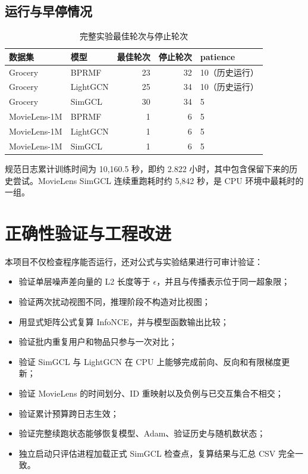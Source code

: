 \documentclass[UTF8,a4paper,12pt]{ctexart}
\begin{document}
\subsection{运行与早停情况}

\begin{table}[H]
  \centering
  \caption{完整实验最佳轮次与停止轮次}
  \label{tab:epochs}
  \begin{tabular}{llrrl}
    \toprule
    数据集 & 模型 & 最佳轮次 & 停止轮次 & patience\\
    \midrule
    Grocery & BPRMF & 23 & 32 & 10（历史运行）\\
    Grocery & LightGCN & 25 & 34 & 10（历史运行）\\
    Grocery & SimGCL & 30 & 34 & 5\\
    MovieLens-1M & BPRMF & 1 & 6 & 5\\
    MovieLens-1M & LightGCN & 1 & 6 & 5\\
    MovieLens-1M & SimGCL & 1 & 6 & 5\\
    \bottomrule
  \end{tabular}
\end{table}

规范日志累计训练时间为 10,160.5 秒，即约 2.822 小时，其中包含保留下来的历史尝试。MovieLens SimGCL 连续重跑耗时约 5,842 秒，是 CPU 环境中最耗时的一组。

\section{正确性验证与工程改进}

本项目不仅检查程序能否运行，还对公式与实验结果进行可审计验证：

\begin{itemize}
  \item 验证单层噪声差向量的 L2 长度等于 $\epsilon$，并且与传播表示位于同一超象限；
  \item 验证两次扰动视图不同，推理阶段不构造对比视图；
  \item 用显式矩阵公式复算 InfoNCE，并与模型函数输出比较；
  \item 验证批内重复用户和物品只参与一次对比；
  \item 验证 SimGCL 与 LightGCN 在 CPU 上能够完成前向、反向和有限梯度更新；
  \item 验证 MovieLens 的时间划分、ID 重映射以及负例与已交互集合不相交；
  \item 验证累计预算跨日志生效；
  \item 验证完整续跑状态能够恢复模型、Adam、验证历史与随机数状态；
  \item 独立启动只评估进程加载正式 SimGCL 检查点，复算结果与汇总 CSV 完全一致。
\end{itemize}
\end{document}
